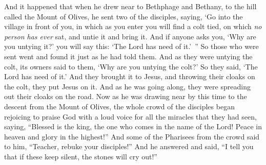 \begin{biblechapter}
\verse And it happened that when he drew near to Bethphage and Bethany, to the hill called the Mount of Olives, he sent two of the disciples,
\verse saying, ‘Go into the village in front of you, in which as you enter you will find a colt tied, on which \textit{no person has ever} sat, and untie it and bring it.
\verse And if anyone asks you, ‘Why are you untying it?’ you will say this: ‘The Lord has need of it.’ ”
\verse So those who were sent went and found it just as he had told them.
\verse And as they were untying the colt, its owners said to them, ‘Why are you untying the colt?’
\verse So they said, ‘The Lord has need of it.’
\verse And they brought it to Jesus, and throwing their cloaks on the colt, they put Jesus on it.
\verse And as he was going along, they were spreading out their cloaks on the road.
\verse Now as he was drawing near by this time to the descent from the Mount of Olives, the whole crowd of the disciples began rejoicing to praise God with a loud voice for all the miracles that they had seen,
\verse saying, “Blessed is the king, 
the one who comes in the name of the Lord! 
Peace in heaven 
and glory in the highest!”
\verse And some of the Pharisees from the crowd said to him, “Teacher, rebuke your disciples!”
\verse And he answered and said, “I tell you that if these keep silent, the stones will cry out!”

\end{biblechapter}
